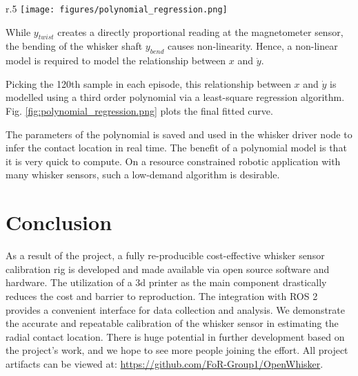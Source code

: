 \documentclass[runningheads]{llncs}
\begin{document}
\begin{wrapfigure}{r}{.5\textwidth}
    \centering
    \texttt{[image: figures/polynomial\_regression.png]}
    \caption{Polynomial Regression of the relationship 100th sample of \(\dot{y}\) in each episode and the contact distance \(x\)}
    \label{fig:polynomial_regression.png}
\end{wrapfigure}

While \(y_{twist}\) creates a directly proportional reading at the magnetometer sensor, the bending of the whisker shaft \(y_{bend}\) causes non-linearity. Hence, a non-linear model is required to model the relationship between \(x\) and \(\dot{y}\).

Picking the 120th sample in each episode, this relationship between \(x\) and \(\dot{y}\) is modelled using a third order polynomial via a least-square regression algorithm. Fig. \ref*{fig:polynomial_regression.png} plots the final fitted curve.

The parameters of the polynomial is saved and used in the whisker driver node to infer the contact location in real time. The benefit of a polynomial model is that it is very quick to compute. On a resource constrained robotic application with many whisker sensors, such a low-demand algorithm is desirable.

\section{Conclusion}

As a result of the project, a fully re-producible cost-effective whisker sensor calibration rig is developed and made available via open source software and hardware. The utilization of a 3d printer as the main component drastically reduces the cost and barrier to reproduction. The integration with ROS 2 provides a convenient interface for data collection and analysis. We demonstrate the accurate and repeatable calibration of the whisker sensor in estimating the radial contact location. There is huge potential in further development based on the project's work, and we hope to see more people joining the effort. All project artifacts can be viewed at: \url{https://github.com/FoR-Group1/OpenWhisker}.


\end{document}
